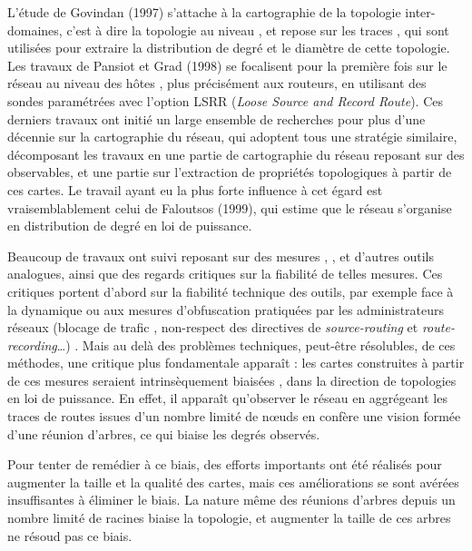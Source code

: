 L'étude de Govindan \etal\cite{govindan1997analysis} (1997) s'attache à la
cartographie de la topologie inter-domaines, c'est à dire la topologie au niveau
\as, et repose sur les traces \bgp, qui sont utilisées pour extraire la
distribution de degré et le diamètre de cette topologie. Les travaux de Pansiot
et Grad\cite{pansiot1998routes} (1998) se focalisent pour la première fois sur
le réseau au niveau des hôtes \LLL, plus précisément aux routeurs, en utilisant
des sondes \traceroute paramétrées avec l'option LSRR ({\em Loose Source and
Record Route}). Ces derniers travaux ont initié un large ensemble de recherches
pour plus d'une décennie sur la cartographie du réseau, qui adoptent tous une
stratégie similaire, décomposant les travaux en une partie de cartographie du
réseau reposant sur des observables, et une partie sur l'extraction de
propriétés topologiques à partir de ces cartes. Le travail ayant eu la plus
forte influence à cet égard est vraisemblablement celui de
Faloutsos\etal\cite{faloutsos1999power} (1999), qui estime que le réseau
s'organise en distribution de degré en loi de puissance.

Beaucoup de travaux ont suivi reposant sur des mesures \traceroute,
\tracetree\cite{sarac2004tracetree,latapy2008radar}, \mrinfo\cite{merlin} et
d'autres outils analogues, ainsi que des regards critiques sur la fiabilité de
telles mesures. Ces critiques portent d'abord sur la fiabilité technique des
outils, par exemple face à la dynamique ou aux mesures d'obfuscation pratiquées
par les administrateurs réseaux (blocage de trafic \icmp, non-respect des
directives de {\em source-routing} et {\em route-recording}\ldots)
\cite{GunesS09,paristraceroute,keys2010internet,keysiffinder,roughan201110,pansiot2012,alias-bias}.
Mais au delà des problèmes techniques, peut-être résolubles, de ces méthodes,
une critique plus fondamentale apparaît :
les cartes construites à partir de ces mesures seraient intrinsèquement biaisées
\cite{roughan201110,willinger,LakhinaBCX03,AchlioptasCKM09,DallAstaABVV06,GuillaumeL05,GuillaumeLM06,latapy2008complex,MDBP10},
dans la direction de topologies en loi de puissance. En effet, il apparaît
qu'observer le réseau en aggrégeant les traces de routes issues d'un nombre
limité de n\oe{}uds en confère une vision formée d'une réunion d'arbres, ce qui
biaise les degrés observés.

Pour tenter de remédier à ce biais, des efforts importants ont été réalisés pour
augmenter la taille et la qualité des cartes, mais ces améliorations se sont
avérées insuffisantes à éliminer le
biais\cite{willinger,latapy2008complex,BarfordBBC01}. La nature même des
réunions d'arbres depuis un nombre limité de racines biaise la topologie, et
augmenter la taille de ces arbres ne résoud pas ce biais.

